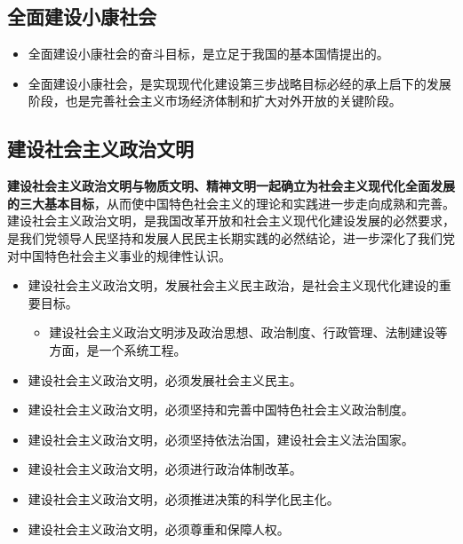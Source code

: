 \documentclass[12pt,openany]{ctexbook}
\begin{document}
\subsection{全面建设小康社会}
\begin{itemize}
  \item 全面建设小康社会的奋斗目标，是立足于我国的基本国情提出的。
  \item 全面建设小康社会，是实现现代化建设第三步战略目标必经的承上启下的发展阶段，也是完善社会主义市场经济体制和扩大对外开放的关键阶段。
\end{itemize}
\subsection{建设社会主义政治文明}
\textbf{建设社会主义政治文明与物质文明、精神文明一起确立为社会主义现代化全面发展的三大基本目标}，从而使中国特色社会主义的理论和实践进一步走向成熟和完善。建设社会主义政治文明，是我国改革开放和社会主义现代化建设发展的必然要求，是我们党领导人民坚持和发展人民民主长期实践的必然结论，进一步深化了我们党对中国特色社会主义事业的规律性认识。
\begin{itemize}
  \item 建设社会主义政治文明，发展社会主义民主政治，是社会主义现代化建设的重要目标。
\begin{itemize}
  \item 建设社会主义政治文明涉及政治思想、政治制度、行政管理、法制建设等方面，是一个系统工程。
\end{itemize}
  \item 建设社会主义政治文明，必须发展社会主义民主。
  \item 建设社会主义政治文明，必须坚持和完善中国特色社会主义政治制度。
  \item 建设社会主义政治文明，必须坚持依法治国，建设社会主义法治国家。
  \item 建设社会主义政治文明，必须进行政治体制改革。
  \item 建设社会主义政治文明，必须推进决策的科学化民主化。
  \item 建设社会主义政治文明，必须尊重和保障人权。
\end{itemize}
\end{document}
